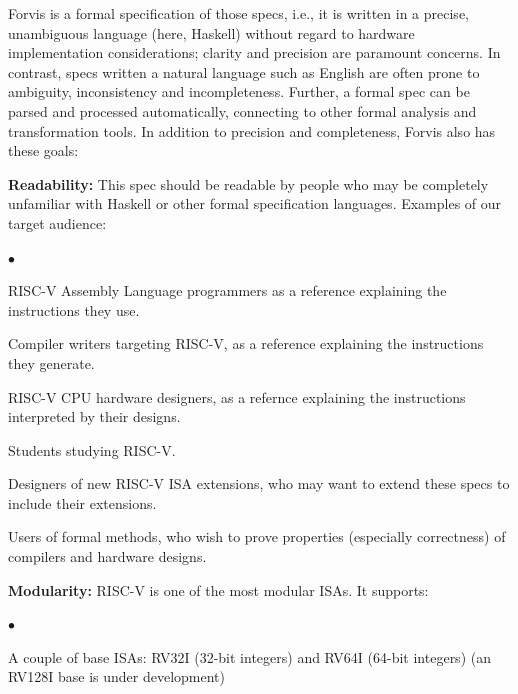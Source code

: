\documentclass[11pt]{article}
\newenvironment{tightlist}%
{\begin{list}{$\bullet$}{%
    \setlength{\topsep}{0in}
    \setlength{\partopsep}{0in}
    \setlength{\itemsep}{0in}
    \setlength{\parsep}{0in}
    \setlength{\leftmargin}{1.5em}
    \setlength{\rightmargin}{0in}
    \setlength{\itemindent}{0in}
}
}%
{\end{list}
}
\begin{document}
Forvis is a formal specification of those specs, i.e., it is written
in a precise, unambiguous language (here, Haskell) without regard to
hardware implementation considerations; clarity and precision are
paramount concerns.  In contrast, specs written a natural language
such as English are often prone to ambiguity, inconsistency and
incompleteness.  Further, a formal spec can be parsed and processed
automatically, connecting to other formal analysis and transformation
tools.  In addition to precision and completeness, Forvis also has
these goals:

\begin{itemize}

\item {\bf Readability:} This spec should be readable by people who
may be completely unfamiliar with Haskell or other formal
specification languages.  Examples of our target audience:

  \begin{tightlist}
   \item RISC-V Assembly Language programmers as a reference explaining the instructions they use.

   \item Compiler writers targeting RISC-V, as a reference explaining the instructions they generate.

   \item RISC-V CPU hardware designers, as a refernce explaining the instructions interpreted by their designs.

   \item Students studying RISC-V.

   \item Designers of new RISC-V ISA extensions, who may want to
   extend these specs to include their extensions.

   \item Users of formal methods, who wish to prove properties
   (especially correctness) of compilers and hardware designs.

  \end{tightlist}

\item {\bf Modularity:} RISC-V is one of the most modular ISAs.  It
supports:

  \begin{tightlist}

   \item A couple of base ISAs: RV32I (32-bit integers) and RV64I
     (64-bit integers) (an RV128I base is under development)


\end{tightlist}
\end{itemize}
\end{document}
